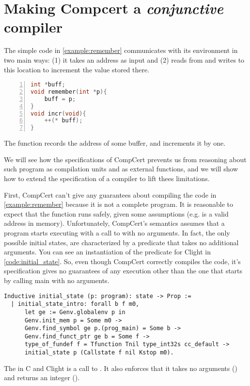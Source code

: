 \chapter{Making Compcert a \emph{conjunctive} compiler }\label{ch:compcert}

The simple code in \ref{example:remember} communicates with its environment in two main ways: (1) it takes an address as input and (2) reads from and writes to this location to increment the value stored there.
\begin{table}\begin{lstlisting}[language=C, numbers=left]
int *buff;
void remember(int *p){
    buff = p;
}
void incr(void){
    ++(* buff);
}
\end{lstlisting}
\caption{The function  records the address of some buffer, and  increments it by one. }
\label{example:remember}
\end{table}
We will see how the specifications of CompCert prevents us from reasoning about such program as compilation units and as external functions, and we will show how to extend the specification of a compiler to lift thees limitations.

First, CompCert can't give any guarantees about compiling the code in \ref{example:remember} because it is not a complete program. It is reasonable to expect that the function  runs safely, given some assumptions (e.g.  is a valid address in memory). Unfortunately, CompCert's semantics assumes that a program starts executing with a call to   with no arguments. In fact, the only possible initial states, are characterized by a predicate  that takes no additional arguments. You can see an instantiation of the predicate for Clight in \ref{code:initial_state}. So, even though CompCert correctly compiles the code, it's specification gives no guarantees of any execution other than the one that starts by calling main with no arguments.
\begin{table}
\begin{lstlisting}
Inductive initial_state (p: program): state -> Prop :=
  | initial_state_intro: forall b f m0,
      let ge := Genv.globalenv p in
      Genv.init_mem p = Some m0 ->
      Genv.find_symbol ge p.(prog_main) = Some b ->
      Genv.find_funct_ptr ge b = Some f ->
      type_of_fundef f = Tfunction Tnil type_int32s cc_default ->
      initial_state p (Callstate f nil Kstop m0).
\end{lstlisting}
\caption{The  in C and Clight is a call to . It also enforces that it takes no arguments () and returns an integer ().}\label{code:initial_state}
\end{table}

